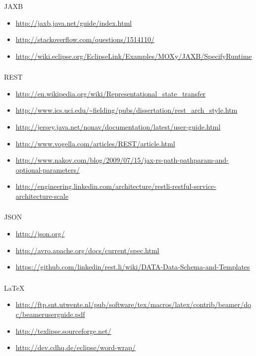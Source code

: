\documentclass[handout]{beamer}
\begin{document}
\begin{frame}
	\frametitle{\insertsection}
	JAXB\\
	\begin{itemize}
		\item \url{http://jaxb.java.net/guide/index.html}
		\item \url{http://stackoverflow.com/questions/1514110/}
		\item \url{http://wiki.eclipse.org/EclipseLink/Examples/MOXy/JAXB/SpecifyRuntime}
	\end{itemize}
\end{frame}

\begin{frame}
	\frametitle{\insertsection}
	REST\\
	\begin{itemize}
		\item \url{http://en.wikipedia.org/wiki/Representational_state_transfer}
		\item \url{http://www.ics.uci.edu/~fielding/pubs/dissertation/rest_arch_style.htm}
		\item \url{http://jersey.java.net/nonav/documentation/latest/user-guide.html}
		\item \url{http://www.vogella.com/articles/REST/article.html}
		\item \url{http://www.nakov.com/blog/2009/07/15/jax-rs-path-pathparam-and-optional-parameters/}
		\item \url{http://engineering.linkedin.com/architecture/restli-restful-service-architecture-scale}
	\end{itemize}
\end{frame}

\begin{frame}
	\frametitle{\insertsection}
	JSON\\
	\begin{itemize}
		\item \url{http://json.org/}
		\item \url{http://avro.apache.org/docs/current/spec.html}
		\item \url{https://github.com/linkedin/rest.li/wiki/DATA-Data-Schema-and-Templates}
	\end{itemize}
\end{frame}

\begin{frame}
	\frametitle{\insertsection}
	\LaTeX\\
	\begin{itemize}
		\item \url{http://ftp.snt.utwente.nl/pub/software/tex/macros/latex/contrib/beamer/doc/beameruserguide.pdf}
		\item \url{http://texlipse.sourceforge.net/}
		\item \url{http://dev.cdhq.de/eclipse/word-wrap/}
	\end{itemize}
\end{frame}
\end{document}
